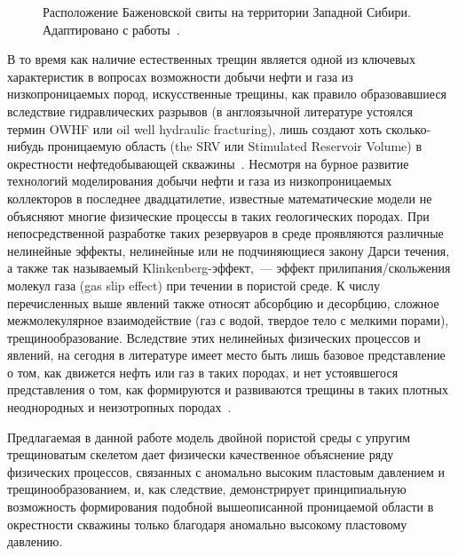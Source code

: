 \begin{figure}[ht]
  \caption{Расположение Баженовской свиты на территории Западной Сибири. Адаптировано с работы~\autocite{USGS}.}
  \label{fig:bazhenov}
\end{figure}

В то время как наличие естественных трещин является одной из ключевых характеристик в вопросах возможности добычи нефти и газа из низкопроницаемых пород, искусственные трещины, как правило образовавшиеся вследствие гидравлических разрывов (в англоязычной литературе устоялся термин OWHF или oil well hydraulic fracturing), лишь создают хоть сколько-нибудь проницаемую область (the SRV или Stimulated Reservoir Volume) в окрестности нефтедобывающей скважины~\autocite{warpinski2009stimulating}. Несмотря на бурное развитие технологий моделирования добычи нефти и газа из низкопроницаемых коллекторов в последнее двадцатилетие, известные математические модели не объясняют многие физические процессы в таких геологических породах. При непосредственной разработке таких резервуаров в среде проявляются различные нелинейные эффекты, нелинейные или не подчиняющиеся закону Дарси течения, а также так называемый Klinkenberg-эффект,~--- эффект прилипания/скольжения молекул газа (gas slip effect)  при течении в пористой среде. К числу перечисленных выше явлений также относят абсорбцию и десорбцию, сложное межмолекулярное взаимодействие (газ с водой, твердое тело с мелкими порами), трещинообразование. Вследствие этих нелинейных физических процессов и явлений, на сегодня в литературе имеет место быть лишь базовое представление о том, как движется нефть или газ в таких породах, и нет устоявшегося представления о том, как формируются и развиваются трещины в таких плотных неоднородных и неизотропных породах~\autocite{warpinski2009stimulating, wu2014generalized}.

Предлагаемая в данной работе модель двойной пористой среды с упругим трещиноватым скелетом дает физически качественное объяснение ряду физических процессов, связанных с аномально высоким пластовым давлением и трещинообразованием, и, как следствие, демонстрирует принципиальную возможность формирования подобной вышеописанной проницаемой области в окрестности скважины только благодаря аномально высокому пластовому давлению.

